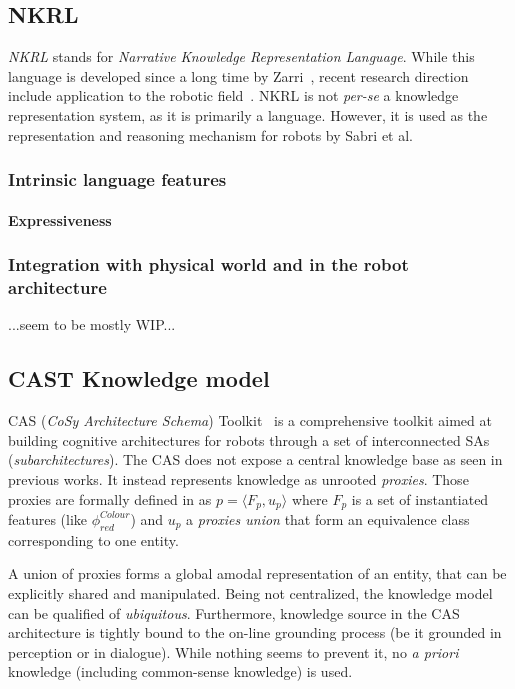 \subsection{NKRL}
\label{sect|nkrl}

\emph{NKRL} stands for \emph{Narrative Knowledge Representation Language}.
While this language is developed since a long time by Zarri~\cite{Zarri1997,
Zarri2008}, recent research direction include application to the robotic
field~\cite{Sabri2011}. NKRL is not {\it per-se} a knowledge representation
system, as it is primarily a language. However, it is used as the
representation and reasoning mechanism for robots by Sabri et al.

\subsubsection{Intrinsic language features}
\label{sect|nkrl-intrinsic-features}

\paragraph{Expressiveness}

\subsubsection{Integration with physical world and in the robot architecture}
\label{sect|nkrl-integration}

...seem to be mostly WIP...


\subsection{CAST Knowledge model}
\label{sect|cast}

CAS (\emph{CoSy Architecture Schema}) Toolkit~\cite{Hawes2007} is a
comprehensive toolkit aimed at building cognitive architectures for robots
through a set of interconnected SAs (\emph{subarchitectures}). The CAS does not
expose a central knowledge base as seen in previous works. It instead
represents knowledge as unrooted \emph{proxies}. Those proxies are formally
defined in \cite{Jacobsson2008} as $p= \langle F_p, u_p \rangle$ where $F_p$ is
a set of instantiated features (like $\phi^{Colour}_{red}$) and $u_p$ a
\emph{proxies union} that form an equivalence class corresponding to one
entity.

A union of proxies forms a global amodal representation of an entity, that can
be explicitly shared and manipulated. Being not centralized, the knowledge
model can be qualified of \emph{ubiquitous}. Furthermore, knowledge source in
the CAS architecture is tightly bound to the on-line grounding process (be it
grounded in perception or in dialogue). While nothing seems to prevent it, no
{\it a priori} knowledge (including common-sense knowledge) is used.

